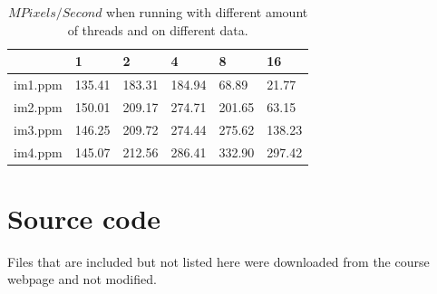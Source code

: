 \documentclass[a4paper,11pt]{article}
\begin{document}
\begin{table}[h!]
  \label{mpixelspersecond}
  \caption{$MPixels/Second$ when running with different amount of threads and on different data.}
  \begin{tabular}[h]{|l|l|l|l|l|l|}
    \hline
                      & 1      & 2      & 4      & 8      & 16\\
    \hline
    im1.ppm           & 135.41 & 183.31 & 184.94 & 68.89  & 21.77\\ 
    im2.ppm           & 150.01 & 209.17 & 274.71 & 201.65 & 63.15\\ 
    im3.ppm           & 146.25 & 209.72 & 274.44 & 275.62 & 138.23\\ 
    im4.ppm           & 145.07 & 212.56 & 286.41 & 332.90 & 297.42\\
    \hline
  \end{tabular}
\end{table}

\clearpage
\section{Source code}
Files that are included but not listed here were downloaded from the course webpage and not modified.


\clearpage


\clearpage

\end{document}
